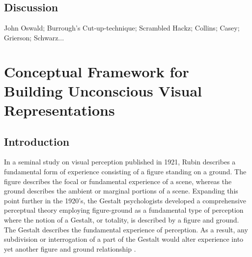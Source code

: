 \documentclass[a4paper,11pt,final]{ThesisStyle}
\begin{document}
\section{Discussion}

John Oswald; Burrough's Cut-up-technique; Scrambled Hackz; Collins; Casey; Grierson; Schwarz...










\chapter{Conceptual Framework for Building Unconscious Visual Representations}
\label{chap:framework-visual}
\minitoc

\section{Introduction}

In a seminal study on visual perception published in 1921, Rubin describes a fundamental form of experience consisting of a figure standing on a ground.  The figure describes the focal or fundamental experience of a scene, whereas the ground describes the ambient or marginal portions of a scene.  Expanding this point further in the 1920's, the Gestalt psychologists developed a comprehensive perceptual theory employing figure-ground as a fundamental type of perception where the notion of a Gestalt, or totality, is described by a figure and ground.  The Gestalt describes the fundamental experience of perception.  As a result, any subdivision or interrogation of a part of the Gestalt would alter experience into yet another figure and ground relationship \cite{Wever1927}.  
\end{document}
